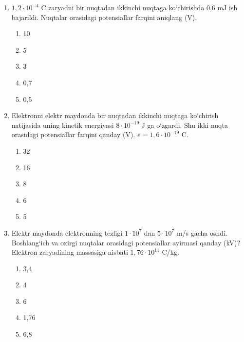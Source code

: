 \begin{enumerate}
    
    \begin{enumerate}[label=\Alph*)]
        \item 0
        \item 10
        \item 8,7
        \item 5
        \item 17
    \end{enumerate}

    \item $1,2 \cdot 10^{-4}$ C zaryadni bir nuqtadan ikkinchi nuqtaga ko‘chirishda 0,6 mJ ish bajarildi. Nuqtalar orasidagi potensiallar farqini aniqlang (V).
    \begin{enumerate}[label=\Alph*)]
        \item 10
        \item 5
        \item 3
        \item 0,7
        \item 0,5
    \end{enumerate}

    \item Elektronni elektr maydonda bir nuqtadan ikkinchi nuqtaga ko‘chirish natijasida uning kinetik energiyasi $8 \cdot 10^{-19}$ J ga o‘zgardi. Shu ikki nuqta orasidagi potensiallar farqini qanday (V). $e=1,6 \cdot 10^{-19}$ C.
    \begin{enumerate}[label=\Alph*)]
        \item 32
        \item 16
        \item 8
        \item 6
        \item 5
    \end{enumerate}

    \item Elektr maydonda elektronning tezligi $1 \cdot 10^7$ dan $5 \cdot 10^7$ m/s gacha oshdi. Boshlang‘ich va oxirgi nuqtalar orasidagi potensiallar ayirmasi qanday (kV)? Elektron zaryadining massasiga nisbati $1,76 \cdot 10^{11}$ C/kg.
    \begin{enumerate}[label=\Alph*)]
        \item 3,4
        \item 4
        \item 6
        \item 1,76
        \item 6,8
    \end{enumerate}


\end{enumerate}
